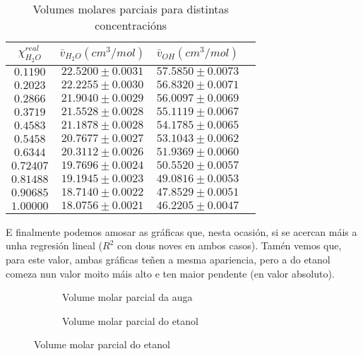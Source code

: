 \documentclass[12pt, a4paper, titlepage]{article}
\begin{document}
  \begin{table}[H]
    \centering
    \begin{tabular}{|c|c|c|c|}
    \hline
    $\chi_{H_2O}^{real}$ & $\bar{v}_{H_2O} (cm^3/mol)$ & $\bar{v}_{OH} (cm^3/mol)$ \\ \hline
    $0.1190 $  & $ 22.5200 \pm 0.0031 $  &  $ 57.5850 \pm 0.0073 $ \\ \hline
    $0.2023 $  & $ 22.2255 \pm 0.0030 $  &  $ 56.8320 \pm 0.0071 $ \\ \hline
    $0.2866 $  & $ 21.9040 \pm 0.0029 $  &  $ 56.0097 \pm 0.0069 $ \\ \hline
    $0.3719 $  & $ 21.5528 \pm 0.0028 $  &  $ 55.1119 \pm 0.0067 $ \\ \hline
    $0.4583 $  & $ 21.1878 \pm 0.0028 $  &  $ 54.1785 \pm 0.0065 $ \\ \hline
    $0.5458 $  & $ 20.7677 \pm 0.0027 $  &  $ 53.1043 \pm 0.0062 $ \\ \hline
    $0.6344 $  & $ 20.3112 \pm 0.0026 $  &  $ 51.9369 \pm 0.0060 $ \\ \hline
    $0.72407 $ & $ 19.7696 \pm 0.0024 $  &  $ 50.5520 \pm 0.0057 $ \\ \hline
    $0.81488 $ & $ 19.1945 \pm 0.0023 $  &  $ 49.0816 \pm 0.0053 $ \\ \hline
    $0.90685 $ & $ 18.7140 \pm 0.0022 $  &  $ 47.8529 \pm 0.0051 $ \\ \hline
    $1.00000 $ & $ 18.0756 \pm 0.0021 $  &  $ 46.2205 \pm 0.0047 $ \\ \hline
    \end{tabular}
    \caption{Volumes molares parciais para distintas concentracións}
    \label{cad:volumes_molares_parciais_concentracions}
  \end{table}

  E finalmente podemos amosar as gráficas que, nesta ocasión, si se acercan máis a unha regresión lineal ($R^2$ con dous noves en ambos casos). Tamén vemos que, para este valor, ambas gráficas teñen a mesma apariencia, pero a do etanol comeza nun valor moito máis alto e ten maior pendente (en valor absoluto).

  \begin{figure}[H]
    \centering
    \begin{minipage}[c]{0,49\textwidth}
      \begin{figure}[H]
        \hspace{-26pt}
        \resizebox{1,05\textwidth}{!}{
        }
        \caption{Volume molar parcial da auga}
        \label{fig:vbarh}
      \end{figure}
    \end{minipage}
    \begin{minipage}[c]{0,49\textwidth}
      \begin{figure}[H]
        \hspace{-26pt}
        \resizebox{1,05\textwidth}{!}{
        }
        \caption{Volume molar parcial do etanol}
        \label{fig:vbaro}
      \end{figure}
    \end{minipage}
  \end{figure}
\end{document}
